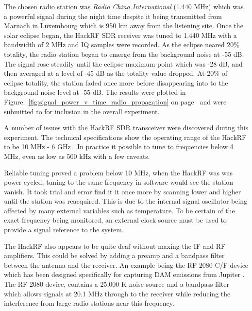 The chosen radio station was \textit{Radio China International} (1.440 MHz) which was a powerful signal during the night time despite it being transmitted from Marnach in Luxembourg which is 950 km away from the listening site. Once the solar eclipse began, the HackRF \gls{SDR} receiver was tuned to 1.440 MHz with a bandwidth of 2 MHz and \gls{IQ} samples were recorded. As the eclipse neared 20\% totality, the radio station began to emerge from the background noise at -55 dB. The signal rose steadily until the eclipse maximum point which was -28 dB, and then averaged at a level of -45 dB as the totality value dropped. At 20\% of eclipse totality, the station faded once more before disappearing into to the background noise level at -55 dB. The results were plotted in Figure.~\ref{fig:signal_power_v_time_radio_propagation} on page~\pageref{fig:signal_power_v_time_radio_propagation} and were submitted to \citet{RSGB-15-b} for inclusion in the overall experiment.

A number of issues with the HackRF \gls{SDR} transceiver were discovered during this experiment. The technical specifications show the operating range of the HackRF to be 10 MHz - 6 GHz \citep{ossmann-15-d}. In practice it possible to tune to frequencies below 4 MHz, even as low as 500 kHz with a few caveats.

Reliable tuning proved a problem below 10 MHz, when the HackRF was was power cycled, tuning to the same frequency in software would see the station vanish. It took trial and error find it it once more by scanning lower and higher until the station was reacquired. This is due to the internal signal oscillator being affected by many external variables such as temperature. To be certain of the exact frequency being monitored, an external clock source must be used to provide a signal reference to the system. 

The HackRF also appears to be quite deaf without maxing the IF and \gls{RF} amplifiers. This could be solved by adding a \gls{preamp} and a bandpass filter between the antenna and the receiver. An example being the RF-2080 C/F device which has been designed specifically for capturing \gls{DAM} emissions from Jupiter \citep{nasa10}. The RF-2080 device, contains a 25,000 K noise source and a bandpass filter which allows signals at 20.1 MHz through to the receiver while reducing the interference from large radio stations near this frequency.


